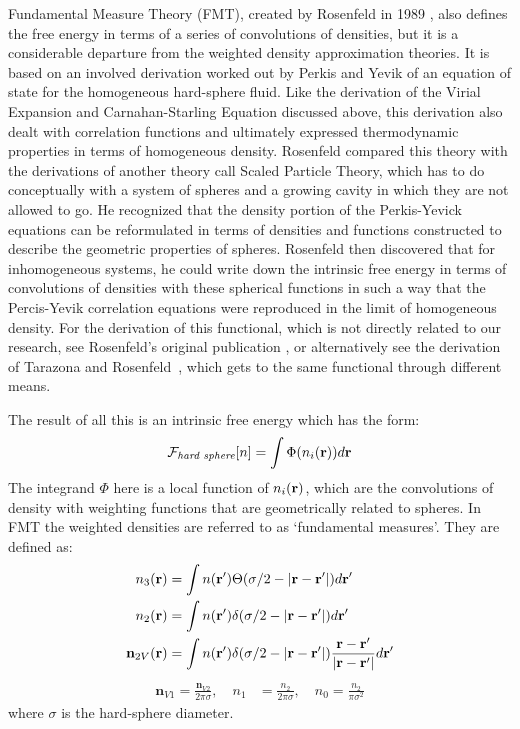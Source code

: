 Fundamental Measure Theory (FMT), created by Rosenfeld in
1989 \cite{rosenfeld1989free,rosenfeld1990free}, also defines the free
energy in terms of a series of convolutions of densities, but it is a
considerable departure from the weighted density approximation
theories.  It is based on an involved derivation worked out by Perkis
and Yevik of an equation of state for the homogeneous hard-sphere
fluid.  Like the derivation of the Virial Expansion and
Carnahan-Starling Equation discussed above, this derivation also dealt
with correlation functions and ultimately expressed thermodynamic
properties in terms of homogeneous density.  Rosenfeld compared this
theory with the derivations of another theory call Scaled Particle
Theory, which has to do conceptually with a system of spheres and a
growing cavity in which they are not allowed to go.  He recognized
that the density portion of the Perkis-Yevick equations can be
reformulated in terms of densities and functions constructed to
describe the geometric properties of spheres.  Rosenfeld then
discovered that for inhomogeneous systems, he could write down the
intrinsic free energy in terms of convolutions of densities with these
spherical functions in such a way that the Percis-Yevik correlation
equations were reproduced in the limit of homogeneous density.  For
the derivation of this functional, which is not directly related to
our research, see Rosenfeld's original
publication \cite{rosenfeld1989free}, or alternatively see the
derivation of Tarazona and
Rosenfeld~\cite{tarazona1997,tarazona1999free,tarazona2000,tarazona2002fundamental},
which gets to the same functional through different means.

The result of all this is an intrinsic free energy which has the form:
\begin{align}
  \label{eq:F-FMT-form}
  \mathcal{F}_\textit{hard~sphere}[n] = \int \Phi({n_i(\textbf{r})})d\textbf{r}
\end{align}
The integrand $\Phi$ here is a local function of $n_i(\textbf{r})$, which are
the convolutions of density with weighting functions that are
geometrically related to spheres.  In FMT the weighted densities are
referred to as `fundamental measures'.  They are defined as:
\begin{align}
  n_3(\textbf{r}) &= \int n(\textbf{r}') \Theta(\sigma/2 -\left|\textbf{r} - \textbf{r}'\right|)
  d\textbf{r}' \label{eq:FMn3} \\
  n_2(\textbf{r}) &= \int n(\textbf{r}') \delta(\sigma/2 -\left|\textbf{r} - \textbf{r}'\right|) d\textbf{r}' \\
  \mathbf{n}_{2V}(\textbf{r}) &= \int n(\textbf{r}') \delta(\sigma/2 -\left|\textbf{r} - \textbf{r}'\right|) \frac{\textbf{r}-\textbf{r}'}{|\textbf{r}-\textbf{r}'|}d\textbf{r}'
\end{align}
\begin{align}
  \mathbf{n}_{V1} = \frac{\mathbf{n}_{V2}}{2\pi \sigma}, \quad
  n_1 &= \frac{n_2}{2\pi \sigma} , \quad
  n_0 = \frac{n_2}{\pi \sigma^2} \label{eq:FMrest}
\end{align}
where $\sigma$ is the hard-sphere diameter.

